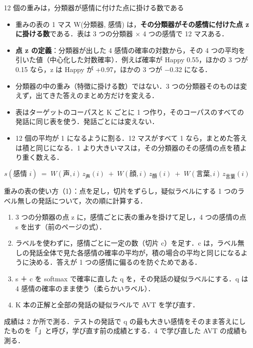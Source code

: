 \begin{frame}{12 個の重みは，分類器が感情に付けた点に掛ける数である}
\scriptsize
\begin{itemize}\setlength\itemsep{2pt}
\item 重みの表の 1 マス W(分類器, 感情) は，\textbf{その分類器がその感情に付けた点 z に掛ける数}である．表は 3 つの分類器 × 4 つの感情で 12 マスある．
\item \textbf{点 z の定義}：分類器が出した 4 感情の確率の対数から，その 4 つの平均を引いた値（中心化した対数確率）．例えば確率が Happy 0.55，ほかの 3 つが 0.15 なら，z は Happy が +0.97，ほかの 3 つが $-$0.32 になる．
\item 分類器の中の重み（特徴に掛ける数）ではない．3 つの分類器そのものは変えず，出てきた答えのまとめ方だけを変える．
\item 表はターゲットのコーパスと K ごとに 1 つ作り，そのコーパスのすべての発話に同じ表を使う．発話ごとには変えない．
\item 12 個の平均が 1 になるように割る．12 マスがすべて 1 なら，まとめた答えは積と同じになる．1 より大きいマスは，その分類器のその感情の点を積より重く数える．
\end{itemize}
\vspace{-0.4em}\[
s(\text{感情 } i) \;=\; W(\text{声}, i)\, z_{\text{声}}(i) \;+\; W(\text{顔}, i)\, z_{\text{顔}}(i) \;+\; W(\text{言葉}, i)\, z_{\text{言葉}}(i)
\]
\end{frame}

\begin{frame}{重みの表の使い方（1）：点を足し，切片をずらし，疑似ラベルにする}
\footnotesize
1 つのラベル無しの発話について，次の順に計算する．
\begin{enumerate}\setlength\itemsep{5pt}
\item 3 つの分類器の点 z に，感情ごとに表の重みを掛けて足し，4 つの感情の点 s を出す（前のページの式）．
\item ラベルを使わずに，感情ごとに一定の数（切片 c）を足す．c は，ラベル無しの発話全体で見た各感情の確率の平均が，積の場合の平均と同じになるように決める．答えが 1 つの感情に偏るのを防ぐためである．
\item s ＋ c を softmax で確率に直した q を，その発話の疑似ラベルにする．q は 4 感情の確率のまま使う（柔らかいラベル）．
\item K 本の正解と全部の発話の疑似ラベルで AVT を学び直す．
\end{enumerate}
\vspace{0.4em}
成績は 2 か所で測る．テストの発話で q の最も大きい感情をそのまま答えにしたものを「」と呼び，学び直す前の成績とする．4 で学び直した AVT の成績も測る．
\end{frame}

